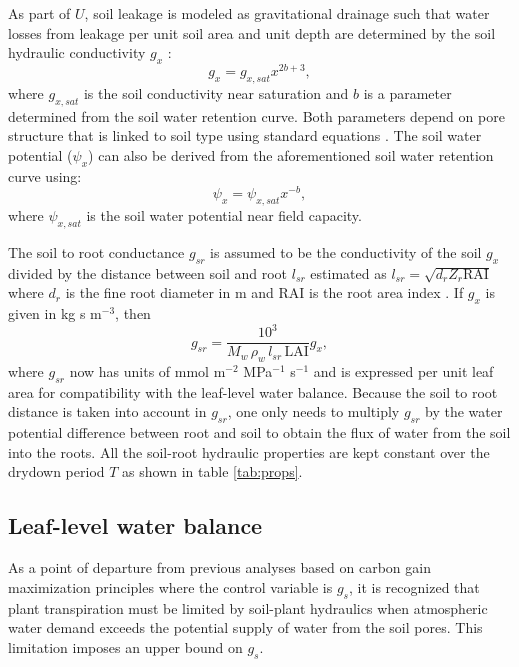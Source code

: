 \documentclass[utf8]{frontiersSCNS} %
\begin{document}
As part of $U$, soil leakage is modeled as gravitational drainage such that water losses from leakage per unit soil area and unit depth are determined by the soil hydraulic conductivity $g_x$ \citep{campbell_introduction_2012}:
\begin{equation}
    \label{eqn:soil_cond}
    g_x = g_{x,sat}x^{2b+3},
\end{equation}
where $g_{x,sat}$ is the soil conductivity near saturation and $b$ is a parameter determined from the soil water retention curve. Both parameters depend on pore structure that is linked to soil type using standard equations \citep{clapp_empirical_1978}. The soil water potential ($\psi_x$) can also be derived from the aforementioned soil water retention curve using:
\begin{equation}
    \label{eqn:Clapp_pot}
    \psi_x = \psi_{x,sat}x^{-b},
\end{equation}
where $\psi_{x,sat}$ is the soil water potential near field capacity.

The soil to root conductance $g_{sr}$ is assumed to be the conductivity of the soil $g_x$ divided by the distance between soil and root $l_{sr}$ estimated as $l_{sr} = \sqrt{d_r Z_r \text{RAI}}$ where $d_r$ is the fine root diameter in m and RAI is the root area index \citep{manzoni_optimization_2013}. If $g_x$ is given in kg s m$^{-3}$, then
\begin{equation}
    \label{eqn:soil_root}
    g_{sr} = \frac{10^3}{M_w \, \rho_w \, l_{sr} \, \text{LAI}} g_x, 
\end{equation}
where $g_{sr}$ now has units of mmol m$^{-2}$ MPa$^{-1}$ s$^{-1}$ and is expressed per unit leaf area for compatibility with the leaf-level water balance. Because the soil to root distance is taken into account in $g_{sr}$, one only needs to multiply $g_{sr}$ by the water potential difference between root and soil to obtain the flux of water from the soil into the roots. All the soil-root hydraulic properties are kept constant over the drydown period $T$ as shown in table \ref{tab:props}.

\subsection{Leaf-level water balance}

As a point of departure from previous analyses based on carbon gain maximization principles where the control variable is $g_s$, it is recognized that plant transpiration must be limited by soil-plant hydraulics when atmospheric water demand exceeds the potential supply of water from the soil pores. This limitation imposes an upper bound on $g_s$. 
\end{document}
